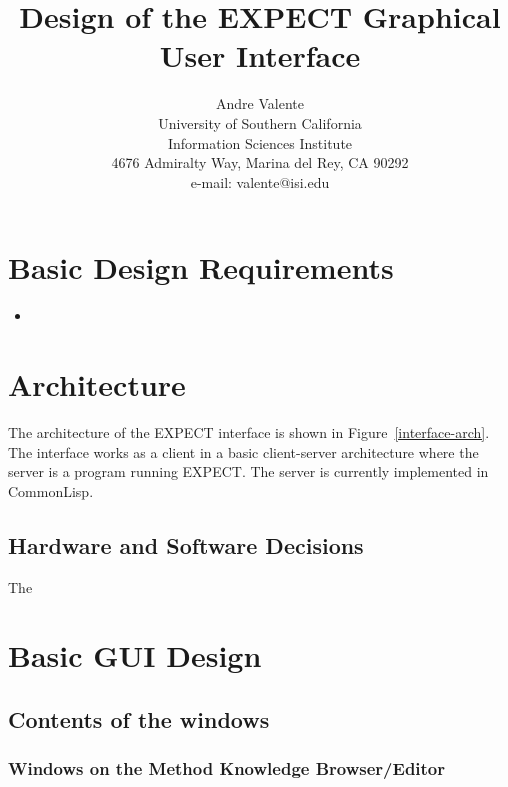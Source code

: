 \documentclass[11pt]{article}
\title{Design of the EXPECT Graphical User Interface}
\author{Andre Valente \\
  University of Southern California\\
  Information Sciences Institute\\
  4676 Admiralty Way, Marina del Rey, CA 90292\\
  e-mail: valente@isi.edu}
\begin{document}
\maketitle


\section{Basic Design Requirements}

\begin{itemize}
\item 
\end{itemize}

\section{Architecture}

The architecture of the EXPECT interface is shown in
Figure~\ref{interface-arch}. The interface works as a client in a
basic client-server architecture where the server is a program running
EXPECT. The server is currently implemented in CommonLisp.


\subsection{Hardware and Software Decisions}

The


\section{Basic GUI Design}

\subsection{Contents of the windows}

\subsubsection{Windows on the Method Knowledge Browser/Editor}
\end{document}
